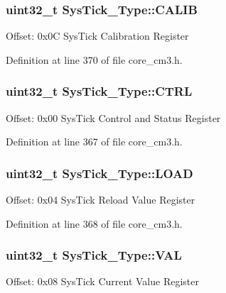 \subsubsection[{\texorpdfstring{C\+A\+L\+IB}{CALIB}}]{ {\bf uint32\+\_\+t} Sys\+Tick\+\_\+\+Type\+::\+C\+A\+L\+IB}\hypertarget{struct_sys_tick___type_a9c9eda0ea6f6a7c904d2d75a6963e238}{}\label{struct_sys_tick___type_a9c9eda0ea6f6a7c904d2d75a6963e238}
Offset\+: 0x0C Sys\+Tick Calibration Register 

Definition at line 370 of file core\+\_\+cm3.\+h.

\subsubsection[{\texorpdfstring{C\+T\+RL}{CTRL}}]{ {\bf uint32\+\_\+t} Sys\+Tick\+\_\+\+Type\+::\+C\+T\+RL}\hypertarget{struct_sys_tick___type_af2ad94ac83e5d40fc6e34884bc1bec5f}{}\label{struct_sys_tick___type_af2ad94ac83e5d40fc6e34884bc1bec5f}
Offset\+: 0x00 Sys\+Tick Control and Status Register 

Definition at line 367 of file core\+\_\+cm3.\+h.

\subsubsection[{\texorpdfstring{L\+O\+AD}{LOAD}}]{ {\bf uint32\+\_\+t} Sys\+Tick\+\_\+\+Type\+::\+L\+O\+AD}\hypertarget{struct_sys_tick___type_ae7bc9d3eac1147f3bba8d73a8395644f}{}\label{struct_sys_tick___type_ae7bc9d3eac1147f3bba8d73a8395644f}
Offset\+: 0x04 Sys\+Tick Reload Value Register 

Definition at line 368 of file core\+\_\+cm3.\+h.

\subsubsection[{\texorpdfstring{V\+AL}{VAL}}]{ {\bf uint32\+\_\+t} Sys\+Tick\+\_\+\+Type\+::\+V\+AL}\hypertarget{struct_sys_tick___type_a0997ff20f11817f8246e8f0edac6f4e4}{}\label{struct_sys_tick___type_a0997ff20f11817f8246e8f0edac6f4e4}
Offset\+: 0x08 Sys\+Tick Current Value Register 

